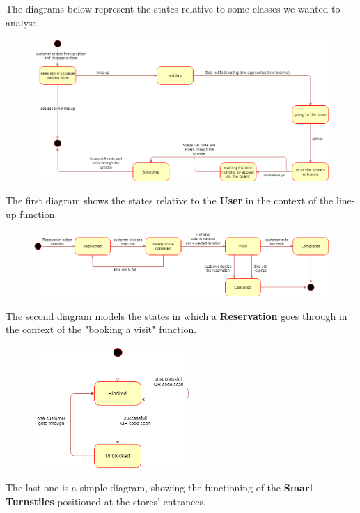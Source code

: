 \documentclass{article}
\begin{document}
The diagrams below represent the states relative to some classes we wanted to analyse.

\begin{figure}[H]


  \includegraphics[width=\linewidth]{Customer_state.png}

\end{figure}

The first diagram shows the states relative to the \textbf{User} in the context of the line-up function.
\begin{figure}[H]



  \includegraphics[width=\linewidth]{Reservation_state.png}


\end{figure}

The second diagram models the states in which a \textbf{Reservation} goes through in the context of the "booking a visit" function.\newline\newline\newline

\begin{figure}[H]

  \includegraphics[width=6cm]{Turnstiles_state.png}


\end{figure}
The last one is a simple diagram, showing the functioning of the \textbf{Smart Turnstiles} positioned at the stores' entrances.
\end{document}
